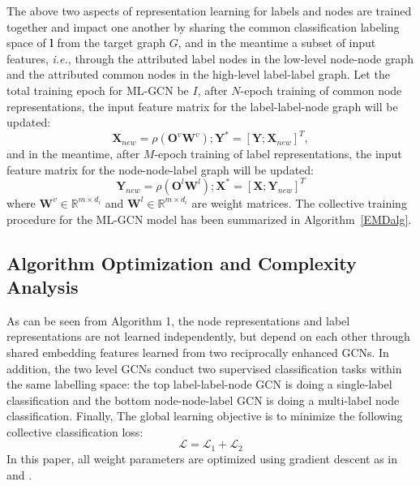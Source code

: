\documentclass[conference]{IEEEtran}
\begin{document}
The above two aspects of representation learning for labels and nodes are trained together and impact one another by sharing the common classification labeling space of $\mathbf{l}$ from the target graph $G$, and in the meantime a subset of input features, \textit{i.e.}, through the attributed label nodes in the low-level node-node graph and the attributed common nodes in the high-level label-label graph. Let the total training epoch for ML-GCN be $I$, after $N$-epoch training of common node representations, the input feature matrix for the label-label-node graph will be updated:
\begin{equation}
\mathbf{X}_{new}=\rho(\mathbf{O}^v \mathbf{W}^v);  \mathbf{Y}^*=[\mathbf{Y};\mathbf{X}_{new}]^T,
\end{equation}
and in the meantime, after $M$-epoch training of label representations, the input feature matrix for the node-node-label graph will be updated:
\begin{equation}
\mathbf{Y}_{new}=\rho(\mathbf{O}^l \mathbf{W}^l);  \mathbf{X}^*=[\mathbf{X};\mathbf{Y}_{new}]^T
\end{equation}
where $\mathbf{W}^v \in \mathbb{R}^{m \times d_i}$ and $\mathbf{W}^l \in \mathbb{R}^{m \times d_i}$ are weight matrices. The collective training procedure for the ML-GCN model has been summarized in Algorithm~\ref{EMDalg}.
\subsection{Algorithm Optimization and Complexity Analysis}
As can be seen from Algorithm 1, the node representations and label representations are not learned independently, but depend on each other through shared embedding features learned from two reciprocally enhanced GCNs. In addition, the two level GCNs conduct two supervised classification tasks within the same labelling space: the top label-label-node GCN is doing a single-label classification and the bottom node-node-label GCN is doing a multi-label node classification. Finally, The global learning objective is to minimize the following collective classification loss:
\begin{equation}
\mathcal{L}=\mathcal{L}_1 + \mathcal{L}_2
\end{equation}
In this paper, all weight parameters are optimized using gradient descent as in \cite{14} and  \cite{25}.
\end{document}
